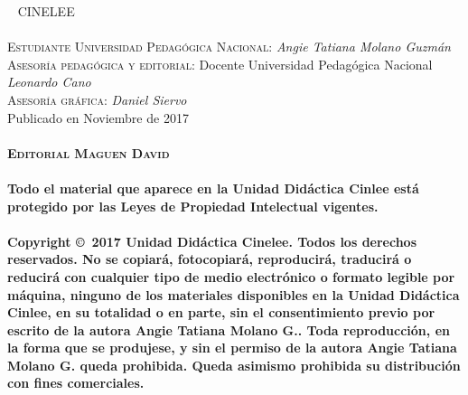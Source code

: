 \documentclass[11pt,fleqn,twocolumn]{book} %
\begin{document}
\newpage
\thispagestyle{empty}
~\vfill
\noindent \textsc{CINELEE}\\\\
\noindent \textsc{Estudiante Universidad Pedagógica Nacional:}  \textit{Angie Tatiana Molano Guzmán}\\
\noindent \textsc{Asesoría pedagógica y editorial:} Docente Universidad Pedagógica Nacional \textit{Leonardo Cano}\\ %
\noindent \textsc{Asesoría gráfica:} \textit{Daniel Siervo}\\ %
\noindent Publicado en Noviembre de 2017 \\\\ %

\noindent \textsc{\textbf{Editorial Maguen David}}\\\\
\noindent \textbf{\small{Todo el material que aparece en la Unidad Didáctica Cinlee está protegido por las Leyes de Propiedad Intelectual vigentes.}}\\\\
\noindent\small{ \textbf{Copyright \copyright\ 2017 Unidad Didáctica Cinelee. Todos los derechos reservados. No se copiará, fotocopiará, reproducirá, traducirá o reducirá con cualquier tipo de medio electrónico o formato legible por máquina, ninguno de los materiales disponibles en la Unidad Didáctica Cinlee, en su totalidad o en parte, sin el consentimiento previo por escrito de la autora Angie Tatiana Molano G.. Toda reproducción, en la forma que se produjese, y sin el permiso de la autora Angie Tatiana Molano G. queda prohibida. Queda asimismo prohibida su distribución con fines comerciales.}}
\large

\pagestyle{empty} %

\renewcommand\contentsname{Tabla de Contenido}
\renewcommand{\bibname}{Bibliographie}
\tableofcontents%


\pagestyle{fancy} %
\end{document}

